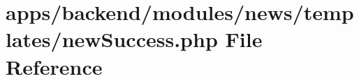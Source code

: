 \hypertarget{backend_2modules_2news_2templates_2new_success_8php}{\section{apps/backend/modules/news/templates/new\-Success.php File Reference}
\label{backend_2modules_2news_2templates_2new_success_8php}
}
